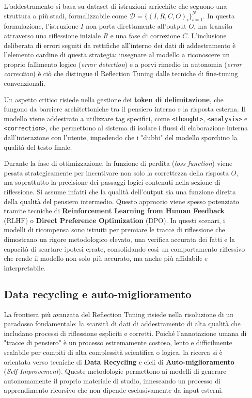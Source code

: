 L'addestramento si basa su dataset di istruzioni arricchite che seguono una struttura a più stadi, formalizzabile come $\mathcal{D} = \{ (I, R, C, O)_i \}_{i=1}^N$. In questa formulazione, l'istruzione $I$ non porta direttamente all'output $O$, ma transita attraverso una riflessione iniziale $R$ e una fase di correzione $C$. L'inclusione deliberata di errori seguiti da rettifiche all'interno dei dati di addestramento è l'elemento cardine di questa strategia: insegnare al modello a riconoscere un proprio fallimento logico (\textit{error detection}) e a porvi rimedio in autonomia (\textit{error correction}) è ciò che distingue il Reflection Tuning dalle tecniche di fine-tuning convenzionali.



Un aspetto critico risiede nella gestione dei \textbf{token di delimitazione}, che fungono da barriere architettoniche tra il pensiero interno e la risposta esterna. Il modello viene addestrato a utilizzare tag specifici, come \texttt{<thought>}, \texttt{<analysis>} e \texttt{<correction>}, che permettono al sistema di isolare i flussi di elaborazione interna dall'interazione con l'utente, impedendo che i "dubbi" del modello sporchino la qualità del testo finale. 

Durante la fase di ottimizzazione, la funzione di perdita (\textit{loss function}) viene pesata strategicamente per incentivare non solo la correttezza della risposta $O$, ma soprattutto la precisione dei passaggi logici contenuti nella sezione di riflessione. Si assume infatti che la qualità dell'output sia una funzione diretta della qualità del pensiero intermedio. Questo approccio viene spesso potenziato tramite tecniche di \textbf{Reinforcement Learning from Human Feedback} (RLHF) \cite{ouyang2022training} o \textbf{Direct Preference Optimization} (DPO). In questi scenari, i modelli di ricompensa sono istruiti per premiare le tracce di riflessione che dimostrano un rigore metodologico elevato, una verifica accurata dei fatti e la capacità di scartare ipotesi errate, consolidando così un comportamento riflessivo che rende il modello non solo più accurato, ma anche più affidabile e interpretabile.

\subsection{Data recycling e auto-miglioramento}

La frontiera più avanzata del Reflection Tuning risiede nella risoluzione di un paradosso fondamentale: la scarsità di dati di addestramento di alta qualità che includano processi di riflessione espliciti e corretti. Poiché l'annotazione umana di "tracce di pensiero" è un processo estremamente costoso, lento e difficilmente scalabile per compiti di alta complessità scientifica o logica, la ricerca si è orientata verso tecniche di \textbf{Data Recycling} e cicli di \textbf{Auto-miglioramento} (\textit{Self-Improvement}). Queste metodologie permettono ai modelli di generare autonomamente il proprio materiale di studio, innescando un processo di apprendimento ricorsivo che non dipende esclusivamente da input esterni.

